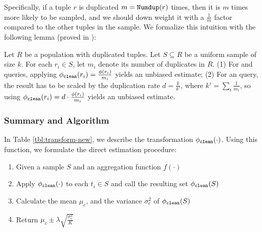 Specifically, if a tuple $r$ is duplicated $m=\Dedup{r}{R}$ times, then it is $m$ times more likely to be sampled, and we should down weight it with a $\frac{1}{m}$ factor compared to the other tuples in the sample.
We formalize this intuition with the following lemma (proved in \cite{wang1999sample}):
\begin{lemma}\label{lem:derror}
Let $R$ be a population with duplicated tuples. %
Let $S \subseteq R$ be a uniform sample of size $k$.
For each $r_{i}\in S$, let $m_i$ denote its number of duplicates in $R$.
 (1) For \sumfunc and \countfunc queries, applying $\saqpplusfunc(r_i)=\frac{\saqpfunc(r_i)}{m_i}$ yields an unbiased estimate;
(2) For an \avgfunc query, the result has to be scaled by the duplication rate $d=\frac{k}{k'}$,
where $k'=\sum_i\frac{1}{m_i}$, so using $\saqpplusfunc(r_i)=d\cdot\frac{\saqpfunc(r_i)}{m_i}$ yields an unbiased estimate.
\end{lemma}

\subsubsection{Summary and Algorithm}
In Table \ref{tbl:transform-new}, we describe the transformation $\saqpplusfunc(\cdot)$.
Using this function, we formulate the direct estimation procedure:

\begin{enumerate}
\item Given a sample $S$ and an aggregation function $f(\cdot)$\vspace{-.5em}
\item Apply $\saqpplusfunc(\cdot)$ to each $t_i \in S$ and call the resulting set $\saqpplusfunc(S)$\vspace{-.5em}
\item Calculate the mean $\mu_c$, and the variance $\sigma_c^2$ of $\saqpplusfunc(S)$\vspace{-.5em}
\item Return $\mu_c \pm \lambda \sqrt{\frac{\sigma_c^2}{K}}$\vspace{-.5em}
\end{enumerate}

